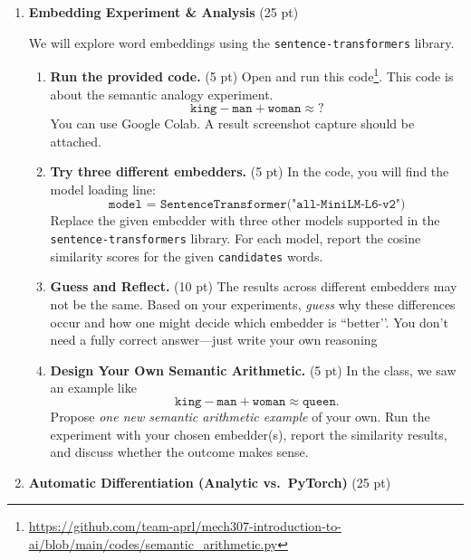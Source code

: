 \documentclass[12pt]{article}
\begin{document}
\begin{enumerate}[label=\textbf{Q\arabic*.}]

\item \textbf{Embedding Experiment \& Analysis} (25 pt)

We will explore word embeddings using the \texttt{sentence-transformers} library.

\begin{enumerate}[label=(\alph*)]

    \item \textbf{Run the provided code.} (5 pt)  
    Open and run this code\footnote{\url{https://github.com/team-aprl/mech307-introduction-to-ai/blob/main/codes/semantic_arithmetic.py}}. This code is about the semantic analogy experiment.
    \[
        \texttt{king} - \texttt{man} + \texttt{woman} \approx ?
    \]
    You can use Google Colab. A result screenshot capture should be attached. 
 
    \item \textbf{Try three different embedders.} (5 pt)  
    In the code, you will find the model loading line:
    \[
        \texttt{model = SentenceTransformer("all-MiniLM-L6-v2")}
    \]
    Replace the given embedder with three other models supported in the \\ \texttt{sentence-transformers} library.  
    For each model, report the cosine similarity scores for the given \texttt{candidates} words.   

    \item \textbf{Guess and Reflect.} (10 pt)  
    The results across different embedders may not be the same.  
    Based on your experiments, \emph{guess} why these differences occur and how one might decide which embedder is ``better’’. You don’t need a fully correct answer—just write your own reasoning

    \item \textbf{Design Your Own Semantic Arithmetic.} (5 pt)  
    In the class, we saw an example like
    \[
        \texttt{king} - \texttt{man} + \texttt{woman} \approx \texttt{queen}.
    \]
    Propose \emph{one new semantic arithmetic example} of your own.  
    Run the experiment with your chosen embedder(s), report the similarity results, and discuss whether the outcome makes sense.

\end{enumerate}


\item \textbf{Automatic Differentiation (Analytic vs.\ PyTorch)} (25 pt)


\end{enumerate}
\end{document}
